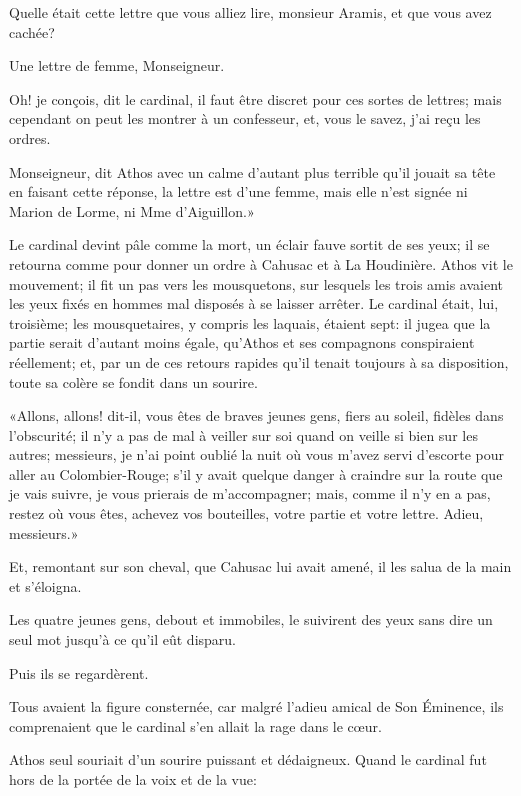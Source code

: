 \speak  Quelle était cette lettre que vous alliez lire, monsieur Aramis, et que vous avez cachée? 

\speak  Une lettre de femme, Monseigneur. 

\speak  Oh! je conçois, dit le cardinal, il faut être discret pour ces sortes de lettres; mais cependant on peut les montrer à un confesseur, et, vous le savez, j'ai reçu les ordres. 

\speak  Monseigneur, dit Athos avec un calme d'autant plus terrible qu'il jouait sa tête en faisant cette réponse, la lettre est d'une femme, mais elle n'est signée ni Marion de Lorme, ni Mme d'Aiguillon.» 

Le cardinal devint pâle comme la mort, un éclair fauve sortit de ses yeux; il se retourna comme pour donner un ordre à Cahusac et à La Houdinière. Athos vit le mouvement; il fit un pas vers les mousquetons, sur lesquels les trois amis avaient les yeux fixés en hommes mal disposés à se laisser arrêter. Le cardinal était, lui, troisième; les mousquetaires, y compris les laquais, étaient sept: il jugea que la partie serait d'autant moins égale, qu'Athos et ses compagnons conspiraient réellement; et, par un de ces retours rapides qu'il tenait toujours à sa disposition, toute sa colère se fondit dans un sourire. 

«Allons, allons! dit-il, vous êtes de braves jeunes gens, fiers au soleil, fidèles dans l'obscurité; il n'y a pas de mal à veiller sur soi quand on veille si bien sur les autres; messieurs, je n'ai point oublié la nuit où vous m'avez servi d'escorte pour aller au Colombier-Rouge; s'il y avait quelque danger à craindre sur la route que je vais suivre, je vous prierais de m'accompagner; mais, comme il n'y en a pas, restez où vous êtes, achevez vos bouteilles, votre partie et votre lettre. Adieu, messieurs.» 

Et, remontant sur son cheval, que Cahusac lui avait amené, il les salua de la main et s'éloigna. 

Les quatre jeunes gens, debout et immobiles, le suivirent des yeux sans dire un seul mot jusqu'à ce qu'il eût disparu. 

Puis ils se regardèrent. 

Tous avaient la figure consternée, car malgré l'adieu amical de Son Éminence, ils comprenaient que le cardinal s'en allait la rage dans le cœur. 

Athos seul souriait d'un sourire puissant et dédaigneux. Quand le cardinal fut hors de la portée de la voix et de la vue: 

